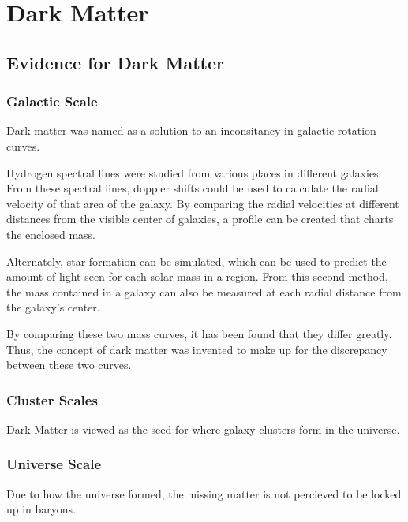 \cleartooddpage[\thispagestyle{empty}]
\chapter{Dark Matter}

\section{Evidence for Dark Matter}




\subsection{Galactic Scale}

Dark matter was named as a solution to an inconsitancy in galactic rotation curves.

Hydrogen spectral lines were studied from various places in different galaxies.
From these spectral lines, doppler shifts could be used to calculate the radial velocity of that area of the galaxy.
By comparing the radial velocities at different distances from the visible center of galaxies, a profile can be created that charts the enclosed mass.

Alternately, star formation can be simulated, which can be used to predict the amount of light seen for each solar mass in a region.
From this second method, the mass contained in a galaxy can also be measured at each radial distance from the galaxy's center.

By comparing these two mass curves, it has been found that they differ greatly.
Thus, the concept of dark matter was invented to make up for the discrepancy between these two curves.



\subsection{Cluster Scales}

Dark Matter is viewed as the seed for where galaxy clusters form in the universe.

\subsection{Universe Scale}

Due to how the universe formed, the missing matter is not percieved to be locked up in baryons.

